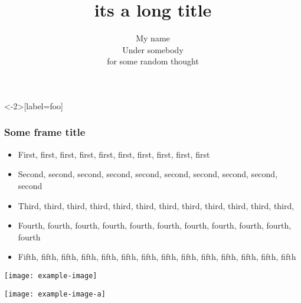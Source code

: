 \documentclass[xcolor={usenames,dvipsnames}]{beamer}
\title{its a long title}
\author[My name]{My name\\ \vspace{0.5cm} Under somebody\\ \vspace{0.5cm} for some random thought}
\date{}
\begin{document}
\begin{frame}
    \titlepage
\end{frame}

\begin{frame}<-2>[label=foo]
    \frametitle{Some frame title}
    \begin{itemize}[<+->]
        \item First, first, first, first, first, first, first, first, first, first
        \item Second, second, second, second, second, second, second, second, second, second
        \item Third, third, third, third, third, third, third, third, third, third, third, third,
        \item Fourth, fourth, fourth, fourth, fourth, fourth, fourth, fourth, fourth, fourth, fourth
        \item Fifth, fifth, fifth, fifth, fifth, fifth, fifth, fifth, fifth, fifth, fifth, fifth, fifth, fifth
    \end{itemize}
\end{frame}

\begin{frame}
    \texttt{[image: example-image]}
\end{frame}


\begin{frame}
    \texttt{[image: example-image-a]}
\end{frame}

\end{document}
